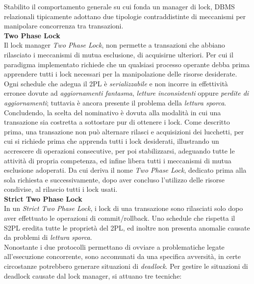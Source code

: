 \documentclass{article}
\begin{document}
Stabilito il comportamento generale su cui fonda un manager di lock, DBMS relazionali tipicamente adottano due tipologie contraddistinte di meccanismi per manipolare concorrenza tra transazioni.\vspace*{14pt}\\
\textbf{Two Phase Lock}\\
Il lock manager \textit{Two Phase Lock}, non permette a transazioni che abbiano rilasciato i meccanismi di mutua esclusione, di acquisirne ulteriori. Per cui il paradigma implementato richiede che un qualsiasi processo operante debba prima apprendere tutti i lock necessari per la manipolazione delle risorse desiderate. Ogni schedule che adegua il 2PL è \textit{serializzabile} e non incorre in effettività erronee dovute ad \textit{aggiornamenti fantasma}, \textit{letture inconsistenti} oppure \textit{perdite di aggiornamenti}; tuttavia è ancora presente il problema della \textit{lettura sporca}.\vspace*{14pt}\\
Concludendo, la scelta del nominativo è dovuta alla modalità in cui una transazione sia costretta a sottostare pur di ottenere i lock. Come descritto prima, una transazione non può alternare rilasci e acquisizioni dei lucchetti, per cui si richiede prima che apprenda tutti i lock desiderati, illustrando un accrescere di operazioni consecutive, per poi stabilizzarsi, adeguando tutte le attività di propria competenza, ed infine libera tutti i meccanismi di mutua esclusione adoperati. Da cui deriva il nome \textit{Two Phase Lock}, dedicato prima alla sola richiesta e successivamente, dopo aver concluso l'utilizzo delle risorse condivise, al rilascio tutti i lock usati.\vspace*{14pt}\\
\textbf{Strict Two Phase Lock}\\
In un \textit{Strict Two Phase Lock}, i lock di una transazione sono rilasciati solo dopo aver effettuato le operazioni di commit/rollback.
Uno schedule che rispetta il S2PL eredita tutte le proprietà del 2PL, ed inoltre non presenta anomalie causate da problemi di \textit{lettura sporca}.\vspace{14pt}\\
Nonostante i due protocolli permettano di ovviare a problematiche legate all'esecuzione concorrente, sono accomunati da una specifica avversità, in certe circostanze potrebbero generare situazioni di \textit{deadlock}. Per gestire le situazioni di deadlock causate dal lock manager, si attuano tre tecniche:
\end{document}
